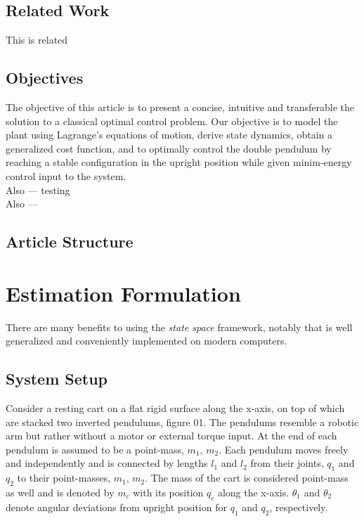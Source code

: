 \documentclass[journal]{IEEEtran}
\begin{document}




\subsection{Related Work}
This is related \\

\subsection{Objectives}
The objective of this article is to present a concise, intuitive and transferable
the solution to a classical optimal control problem.
Our objective is to model the plant using Lagrange's equations of motion,
derive state dynamics, obtain a generalized cost function, and to optimally
control the double pendulum by reaching a stable configuration in the upright
position while given minim-energy control input to the system.\\
Also --- testing\\
Also ---\\

\subsection{Article Structure}



\section{Estimation Formulation}
There are many benefits to using the \emph{state space} framework, notably that
is well generalized and conveniently implemented on modern computers.

\subsection{System Setup}
Consider a resting cart on a flat rigid surface along the x-axis, on top of
which are stacked two inverted pendulums, figure 01. The pendulums resemble a
robotic arm but rather without a motor or external torque input. At the end of
each pendulum is assumed to be a point-mass, \(m_1\), \(m_2\). Each pendulum
moves freely and independently and is connected by lengths \(l_1\) and \(l_2\)
from their joints, \(q_1\) and \(q_2\) to their point-masses, \(m_1\),
\(m_2\). The mass of the cart is considered point-mass as well and is denoted
by \(m_c\) with its position \(q_c\) along the x-axis. \(\theta_1\) and
\(\theta_2\) denote angular deviations from upright position for \(q_1\) and
\(q_2\), respectively.
\end{document}
